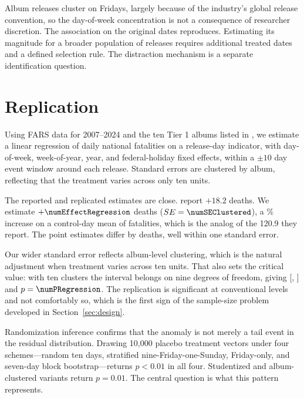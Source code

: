 \documentclass[11pt]{article}
\begin{document}
Album releases cluster on Fridays, largely because of the industry's global release
convention, so the day-of-week concentration is not a consequence of researcher discretion. The association on the original dates reproduces. Estimating its magnitude for a broader
population of releases requires additional treated dates and a defined selection rule.
The distraction mechanism is a separate identification question.

\section{Replication}
\label{sec:replication}

Using FARS data for 2007--2024 and the ten Tier 1 albums listed in \citet{patel2026smartphones}, we estimate a linear regression of daily national fatalities on a release-day indicator, with day-of-week, week-of-year, year, and federal-holiday fixed effects, within a $\pm 10$ day event window around each release. Standard errors are clustered by album, reflecting that the treatment varies across only ten units.

The reported and replicated estimates are close. \citeauthor{patel2026smartphones} report $+18.2$
deaths. We estimate $+\numEffectRegression$ deaths ($SE = \numSEClustered$), a
\numPctRegression\% increase on a control-day mean of \numControlMean{} fatalities, which is the
analog of the 120.9 they report. The point estimates differ by \numDiffFromPaper{} deaths, well
within one standard error.

Our wider standard error reflects album-level clustering, which is the natural adjustment when
treatment varies across ten units. That also sets the critical value: with ten clusters the
interval belongs on nine degrees of freedom, giving [\numCIRegressionLo, \numCIRegressionHi] and
$p = \numPRegression$. The replication is significant at conventional levels and not comfortably
so, which is the first sign of the sample-size problem developed in Section~\ref{sec:design}.



Randomization inference confirms that the anomaly is not merely a tail event in the residual distribution. Drawing 10{,}000 placebo treatment vectors under four schemes---random ten days, stratified nine-Friday-one-Sunday, Friday-only, and seven-day block bootstrap---returns $p < 0.01$ in all four. Studentized and album-clustered variants return $p = 0.01$. The central question is what this pattern represents.
\end{document}
